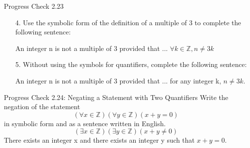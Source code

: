 \documentclass{beamer}
\begin{document}
\begin{frame}{Progress Check 2.23}
	\begin{enumerate}
		\item[4.] Use the symbolic form of the definition of a multiple of 3 to complete the following sentence:
		\begin{center}
			An integer n is not a multiple of 3 provided that ... \pause $\forall k \in \mathbb{Z}, n \neq 3k$
		\end{center}
		\item[5.] Without using the symbols for quantifiers, complete the following sentence: 
		\begin{center}
			An integer n is not a multiple of 3 provided that ... \pause for any integer k, $n \neq 3k$.
		\end{center}
	\end{enumerate}
\end{frame}

\begin{frame}{Progress Check 2.24: Negating a Statement with Two Quantifiers}
	Write the negation of the statement
	\[
	(\forall x \in \mathbb{Z})(\forall y \in \mathbb{Z})(x+y = 0)
	\]
	in symbolic form and as a sentence written in English. \pause
	\[
	(\exists x \in \mathbb{Z})(\exists y \in \mathbb{Z})(x+y \neq 0)
	\]
	\pause
	There exists an integer x and there exists an integer y such that $x + y = 0$.
\end{frame} 
\end{document}
